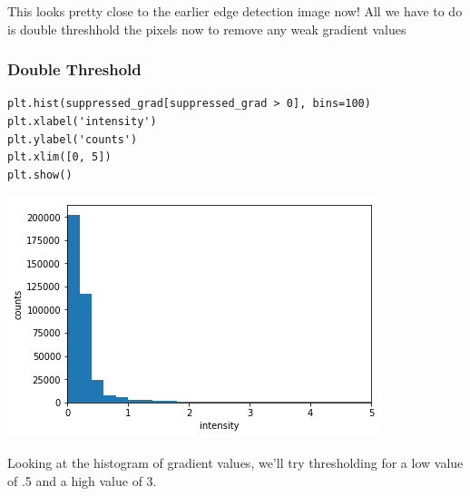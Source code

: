 \documentclass[11pt]{article}
\begin{document}
This looks pretty close to the earlier edge detection image now! All we have to
do is double threshhold the pixels now to remove any weak gradient values

\subsubsection*{Double Threshold}
\label{sec-5-1-4}

\begin{verbatim}
plt.hist(suppressed_grad[suppressed_grad > 0], bins=100)
plt.xlabel('intensity')
plt.ylabel('counts')
plt.xlim([0, 5])
plt.show()
\end{verbatim}

\includegraphics[width=.9\linewidth]{./obipy-resources/333ORm.png}

Looking at the histogram of gradient values, we'll try thresholding for a low
value of .5 and a high value of 3.
\end{document}
